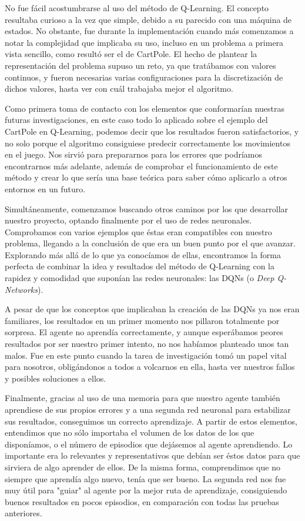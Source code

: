 No fue fácil acostumbrarse al uso del método de Q-Learning. El concepto resultaba curioso a la vez que simple, debido a su parecido con una máquina de estados. No obstante, fue durante la implementación cuando más comenzamos a notar la complejidad que implicaba su uso, incluso en un problema a primera vista sencillo, como resultó ser el de CartPole. El hecho de plantear la representación del problema supuso un reto, ya que tratábamos con valores continuos, y fueron necesarias varias configuraciones para la discretización de dichos valores, hasta ver con cuál trabajaba mejor el algoritmo.

Como primera toma de contacto con los elementos que conformarían nuestras futuras investigaciones, en este caso todo lo aplicado sobre el ejemplo del CartPole en Q-Learning, podemos decir que los resultados fueron satisfactorios, y no solo porque el algoritmo consiguiese predecir correctamente los movimientos en el juego. Nos sirvió para prepararnos para los errores que podríamos encontrarnos más adelante, además de comprobar el funcionamiento de este método y crear lo que sería una base teórica para saber cómo aplicarlo a otros entornos en un futuro.

Simultáneamente, comenzamos buscando otros caminos por los que desarrollar nuestro proyecto, optando finalmente por el uso de redes neuronales. Comprobamos con varios ejemplos que éstas eran compatibles con nuestro problema, llegando a la conclusión de que era un buen punto por el que avanzar. Explorando más allá de lo que ya conocíamos de ellas, encontramos la forma perfecta de combinar la idea y resultados del método de Q-Learning con la rapidez y comodidad que suponían las redes neuronales: las DQNs (o \textit{Deep Q-Networks}). 

A pesar de que los conceptos que implicaban la creación de las DQNs ya nos eran familiares, los resultados en un primer momento nos pillaron totalmente por sorpresa. El agente no aprendía correctamente, y aunque esperábamos peores resultados por ser nuestro primer intento, no nos habíamos planteado unos tan malos. Fue en este punto cuando la tarea de investigación tomó un papel vital para nosotros, obligándonos a todos a volcarnos en ella, hasta ver nuestros fallos y posibles soluciones a ellos. 

Finalmente, gracias al uso de una memoria para que nuestro agente también aprendiese de sus propios errores y a una segunda red neuronal para estabilizar sus resultados, conseguimos un correcto aprendizaje. A partir de estos elementos, entendimos que no sólo importaba el volumen de los datos de los que disponíamos, o el número de episodios que dejásemos al agente aprendiendo. Lo importante era lo relevantes y representativos que debían ser éstos datos para que sirviera de algo aprender de ellos. De la misma forma, comprendimos que no siempre que aprendía algo nuevo, tenía que ser bueno. La segunda red nos fue muy útil para "guiar" al agente por la mejor ruta de aprendizaje, consiguiendo buenos resultados en pocos episodios, en comparación con todas las pruebas anteriores.  

